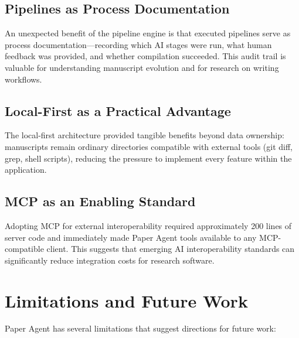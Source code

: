 \documentclass[11pt,a4paper]{article}
\newcommand{\software}{Paper Agent}
\begin{document}
\subsection{Pipelines as Process Documentation}

An unexpected benefit of the pipeline engine is that executed pipelines serve
as process documentation---recording which AI stages were run, what human
feedback was provided, and whether compilation succeeded. This audit trail is
valuable for understanding manuscript evolution and for research on writing
workflows.

\subsection{Local-First as a Practical Advantage}

The local-first architecture provided tangible benefits beyond data ownership:
manuscripts remain ordinary directories compatible with external tools (git
diff, grep, shell scripts), reducing the pressure to implement every feature
within the application.

\subsection{MCP as an Enabling Standard}

Adopting MCP for external interoperability required approximately 200 lines of
server code and immediately made \software{} tools available to any
MCP-compatible client. This suggests that emerging AI interoperability
standards can significantly reduce integration costs for research software.

\section{Limitations and Future Work}

\software{} has several limitations that suggest directions for future work:
\end{document}
